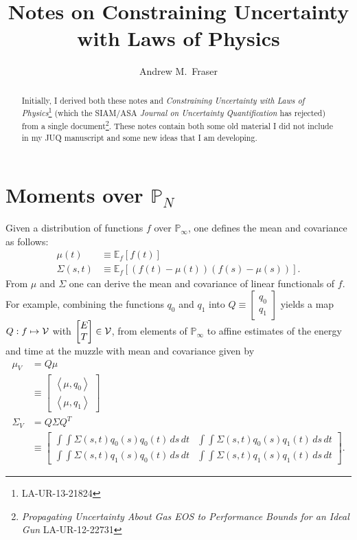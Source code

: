 \documentclass[]{article}
\title{Notes on Constraining Uncertainty with Laws of Physics}
\author{Andrew M.\ Fraser}
\newcommand{\field}[1]{\mathbb{#1}}
\newcommand\Polytope[1]{\field{P}_{#1}}
\newcommand\PolytopeN{\Polytope{N}}
\newcommand\PolytopeInf{\Polytope{\infty}}
\newcommand{\EV}[2]{\field{E}_{#1}\left[#2\right]}
\newcommand\inner[2]{\left<#1,#2\right>}
\begin{document}
\tableofcontents
\maketitle
\begin{abstract}
  Initially, I derived both these notes and \emph{Constraining
    Uncertainty with Laws of Physics}\footnote{LA-UR-13-21824} (which
  the SIAM/ASA \emph{Journal on Uncertainty Quantification} has
  rejected) from a single document\footnote{\emph{Propagating
      Uncertainty About Gas EOS to Performance Bounds for an Ideal
      Gun} LA-UR-12-22731}.  These notes contain both some old
  material I did not include in my JUQ manuscript and some new ideas
  that I am developing.
\end{abstract}

\section{Moments over $\PolytopeN$}
\label{sec:moments}

Given a distribution of functions $f$ over $\PolytopeInf$, one
defines the mean and covariance as follows:
\begin{align*}
  \mu(t) &\equiv \EV{f}{f(t)} \\
  \Sigma(s,t) &\equiv \EV{f}{(f(t)-\mu(t))(f(s)-\mu(s))}.
\end{align*}
From $\mu$ and $\Sigma$ one can derive the mean and covariance of
linear functionals of $f$.  For example, combining the functions $q_0$
and $q_1$ into $Q \equiv \begin{bmatrix} q_0\\q_1 \end{bmatrix}$
yields a map $Q:f\mapsto {\cal V}$ with $\begin{bmatrix}
  E\\T \end{bmatrix}\in {\cal V}$, from elements of $\PolytopeInf$ to
affine estimates of the energy and time at the muzzle with mean and
covariance given by
\begin{subequations}
  \label{eq:qmoments}
  \begin{align}
    \mu_V &= Q \mu\\
    &\equiv \begin{bmatrix} \inner{\mu}{q_0} \\
      \inner{\mu}{q_1} \end{bmatrix}\\
    \Sigma_V &= Q\Sigma Q^T \\
    &\equiv
    \begin{bmatrix}
      \int\int \Sigma(s,t) q_0(s) q_0(t) \,ds \,dt & \int\int
      \Sigma(s,t) q_0(s) q_1(t) \,ds \,dt \\
      \int\int \Sigma(s,t) q_1(s) q_0(t) \,ds \,dt & \int\int
      \Sigma(s,t) q_1(s) q_1(t) \,ds \,dt
    \end{bmatrix}.
  \end{align}
\end{subequations}
\end{document}
